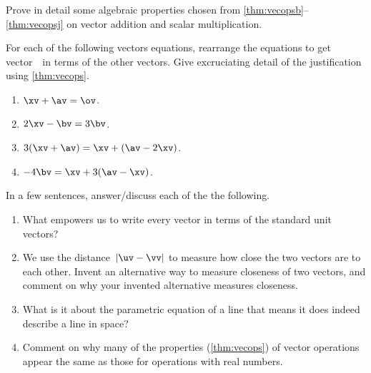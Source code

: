 \begin{exercise} \label{ex:} 
Prove in detail some algebraic properties chosen from \autoref{thm:vecopsb}--\ref{thm:vecopsj} on vector addition and scalar multiplication.
\end{exercise}




\begin{exercise} \label{ex:} 
For each of the following vectors equations, rearrange the equations to get vector~\xv\ in terms of the other vectors.  Give excruciating detail of the justification using \autoref{thm:vecops}.
\begin{enumerate}
\item \(\xv+\av=\ov\).
\item \(2\xv-\bv=3\bv\).
\item \(3(\xv+\av)=\xv+(\av-2\xv)\).
\item \(-4\bv=\xv+3(\av-\xv)\).
\end{enumerate}
\end{exercise}




\begin{exercise} \label{ex:} 
In a few sentences, answer\slash discuss each of the the following.
\begin{enumerate}
\item What empowers us to write every vector in terms of the standard unit vectors?

\item We use the distance~\(|\uv-\vv|\) to measure how close the two vectors are to each other.  Invent an alternative way to measure closeness of two vectors, and comment on why your invented alternative measures closeness.

\item What is it about the parametric equation of a line that means it does indeed describe a line in space?

\item Comment on why many of the properties (\autoref{thm:vecops}) of vector operations appear the same as those for operations with real numbers. 


\end{enumerate}
\end{exercise}





\begin{comment}%
why, what caused X?
how did X occur?
what-if? what-if-not?
how does X compare with Y?
what is the evidence for X?
why is X important?
\end{comment}

